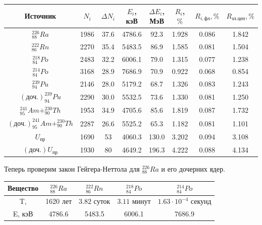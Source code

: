 \documentclass[a4paper,12pt]{article}
\begin{document}
\begin{table}[H]
\begin{tabular}{|c|c|c|c|c|c|c|c|}
\hline
Источник & $N_i$ & $\Delta N_i$ & $E_i$, кэВ & $\Delta E_i$, МэВ & $R_i$, $\%$ & $R_{i,\text{фл}}, \%$ & $R_\text{эл.цеп}, \%$ \\
\hline
$^{226}_{88}Ra$ & 1986 & 37.6 & 4786.6 & 92.3 & 1.928 & 0.086 & 1.842 \\
\hline
$^{222}_{86}Rn$ & 2270 & 35.4 & 5483.5 & 86.9 & 1.585 & 0.081 & 1.504 \\
\hline
$^{218}_{84}Po$ & 2483 & 32.2 & 6006.1 & 79.0 & 1.315 & 0.077 & 1.238 \\
\hline
$^{214}_{84}Po$ & 3168 & 28.9 & 7686.9 & 70.9 & 0.922 & 0.068 & 0.854 \\
\hline
$^{239}_{94}Pu$ & 2146 & 28.0 & 5179.2 & 68.7 & 1.326 & 0.083 & 1.243 \\
\hline
$(\text{доч.}) ^{239}_{94}Pu$ & 2290 & 30.0 & 5532.5 & 73.6 & 1.330 & 0.081 & 1.250 \\
\hline
$^{241}_{95}Am + ^{230}_{90}Th$ & 1953 & 34.9 & 4705.6 & 85.6 & 1.819 & 0.087 & 1.732 \\ 
\hline
$(\text{доч.}) ^{241}_{95}Am + ^{230}_{90}Th$ & 2287 & 26.6 & 5525.2 & 65.3 & 1.182 & 0.081 & 1.101 \\
\hline
$U_\text{пр}$ & 1690 & 53 & 4060.3 & 130.0 & 3.202 & 0.094 & 3.108 \\
\hline
$(\text{доч.}) U_\text{пр}$ & 1930 & 80 & 4649.2 & 196.3 & 4.222 & 0.088 & 4.134 \\
\hline
\end{tabular}
\end{table}

Теперь проверим закон Гейгера-Неттола для $^{226}_{88}Ra$ и его дочерних ядер.
\begin{table}[H]
\centering
\begin{tabular}{|c|c|c|c|c|}
\hline
Вещество & $^{226}_{88}Ra$ & $^{222}_{86}Rn$ & $^{218}_{84}Po$ & $^{214}_{84}Po$ \\
\hline
T, & 1620 лет & $3.82$ суток & $3.11$ минут & $1.63 \cdot 10^{-4}$ секунд \\
\hline
E, кэВ & 4786.6 & 5483.5 & 6006.1 & 7686.9 \\
\hline
\end{tabular}
\end{table}
\end{document}
